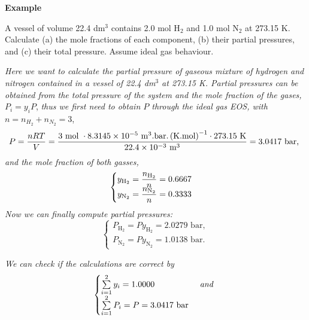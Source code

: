    \begin{MyExample}{\begin{center}{\bf Example}\end{center}}
     \begin{example}\label{Chapter:Intro_Property_of_Gases:Example5}
       \citep{Atkins_Book} A vessel of volume 22.4 dm$^{3}$ contains 2.0 mol H$_{2}$ and 1.0 mol N$_{2}$ at 273.15 K. Calculate (a) the mole fractions of each component, (b) their partial pressures, and (c) their total pressure. Assume ideal gas behaviour.
\medskip

      {\it Here we want to calculate the partial pressure of gaseous mixture of hydrogen and nitrogen contained in a vessel of 22.4 dm$^{3}$ at 273.15 K. Partial pressures can be obtained from the total pressure of the system and the mole fraction of the gases, } $P_{i}=y_{i}P$, {\it thus we first need to obtain $P$ through the ideal gas EOS, with} $n=n_{H_{2}}+n_{N_{2}}=3$,
      \begin{displaymath}
        P = \frc{n R T }{V} = \frc{3\text{ mol } \cdot 8.3145\times 10^{-5}\text{ m}^{3}\text{.bar.}\left(\text{K.mol}\right)^{-1}\cdot 273.15\text{ K}}{22.4\times 10^{-3}\text{ m}^{3}} = 3.0417\text{ bar, }
      \end{displaymath}
      {\it and the mole fraction of both gasses,}
       \begin{displaymath}
         \begin{cases}
           y_{\text{H}_{2}} = \frc{n_{\text{H}_{2}}}{n} = 0.6667  \\
           y_{\text{N}_{2}} = \frc{n_{\text{N}_{2}}}{n} = 0.3333  
         \end{cases}
       \end{displaymath}
       {\it Now we can finally compute partial pressures:}
       \begin{displaymath}
         \begin{cases}
           P_{\text{H}_{2}} = Py_{\text{H}_{2}} = 2.0279\text{ bar},  \\
           P_{\text{N}_{2}} = Py_{\text{N}_{2}} = 1.0138\text{ bar}.
         \end{cases}
       \end{displaymath}


       {\it We can check if the calculations are correct by}
       \begin{displaymath}
         \begin{cases}
           \summation[y_{i}]{i=1}{2} = 1.0000  & \textit{ and } \\
           \summation[P_{i}]{i=1}{2} = P = 3.0417\text{ bar} & \\
         \end{cases}
       \end{displaymath}
           
     \end{example}
   \end{MyExample}
\medskip



